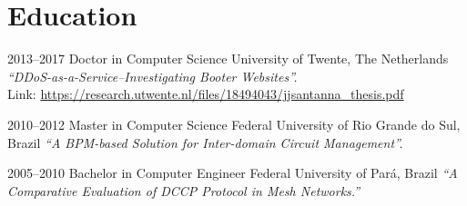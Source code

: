 \documentclass[print]{styles/friggeri-cv-mac} %
\begin{document}


\newpage
\setlength\parindent{0pt}
\section{Education}\vspace{-5pt}
\begin{entrylist}

\entry
{2013--2017}
{Doctor {\normalfont in Computer Science}}
{University of Twente, The Netherlands}
{\emph{``DDoS-as-a-Service--Investigating Booter Websites''.} \\
	Link: \href{https://research.utwente.nl/files/18494043/jjsantanna\_thesis.pdf}{https://research.utwente.nl/files/18494043/jjsantanna\_thesis.pdf}
}

\entry
{2010--2012}
{Master {\normalfont in Computer Science}}
{Federal University of Rio Grande do Sul, Brazil}
{\emph{``A BPM-based Solution for Inter-domain Circuit Management''.}\\
}

\entry
{2005--2010}
{Bachelor {\normalfont in Computer Engineer}}
{Federal University of Par\'a, Brazil}
{\emph{``A Comparative Evaluation of DCCP Protocol in Mesh Networks.''} \\ 
}

\end{entrylist}

\end{document}
